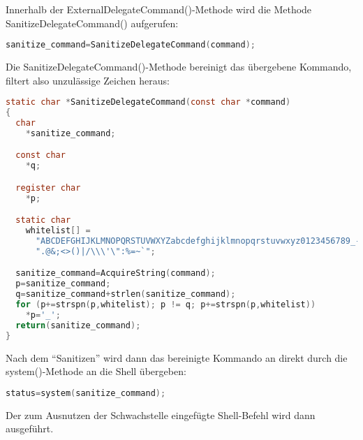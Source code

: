 Innerhalb der ExternalDelegateCommand()-Methode wird die Methode SanitizeDelegateCommand() aufgerufen:\\

\begin{lstlisting}[firstnumber=395, language=C, caption=magick/delegate.c Aufruf SanitizeDelegateCommand(),label={lst:lstlisting}]
  sanitize_command=SanitizeDelegateCommand(command);
\end{lstlisting}
\vspace{5mm}

Die SanitizeDelegateCommand()-Methode bereinigt das übergebene Kommando, filtert also unzulässige Zeichen heraus:\\

\begin{lstlisting}[firstnumber=322, language=C, caption=magick/delegate.c SanitizieDelegateCommand(),label={lst:lstlisting}]
static char *SanitizeDelegateCommand(const char *command)
{
  char
    *sanitize_command;

  const char
    *q;

  register char
    *p;

  static char
    whitelist[] =
      "ABCDEFGHIJKLMNOPQRSTUVWXYZabcdefghijklmnopqrstuvwxyz0123456789_- "
      ".@&;<>()|/\\\'\":%=~`";

  sanitize_command=AcquireString(command);
  p=sanitize_command;
  q=sanitize_command+strlen(sanitize_command);
  for (p+=strspn(p,whitelist); p != q; p+=strspn(p,whitelist))
    *p='_';
  return(sanitize_command);
}
\end{lstlisting}
\vspace{5mm}

Nach dem "`Sanitizen"' wird dann das bereinigte Kommando an direkt durch die system()-Methode an die Shell übergeben:\\

\begin{lstlisting}[firstnumber=402, language=C, caption=magick/delegate.c Aufruf system(),label={lst:lstlisting}]
  status=system(sanitize_command);
\end{lstlisting}
\vspace{5mm}

Der zum Ausnutzen der Schwachstelle eingefügte Shell-Befehl wird dann ausgeführt.